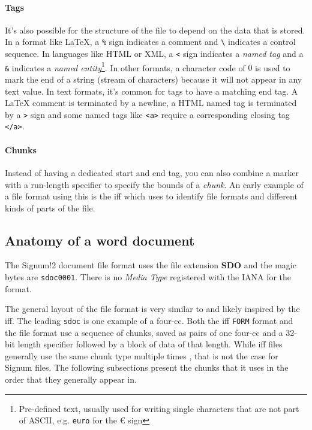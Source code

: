 \paragraph{Tags}
It's also possible for the structure of the file to depend on the data that is stored. In a format like \LaTeX, a \texttt{\%} sign indicates a comment and \texttt{\textbackslash} indicates a control sequence. In languages like HTML or XML, a \texttt{<} sign indicates a \textit{named tag} and a \texttt{\&} indicates a \textit{named entity}\footnote{Pre-defined text, usually used for writing single characters that are not part of ASCII, e.g. \texttt{euro} for the \euro{} sign}. In other formats, a character code of $0$ is used to mark the end of a string (stream of characters) because it will not appear in any text value. In text formats, it's common for tags to have a matching end tag. A \LaTeX{} comment is terminated by a newline, a HTML named tag is terminated by a \texttt{>} sign and some named tags like \texttt{<a>} require a corresponding closing tag \texttt{</a>}.

\paragraph{Chunks}
Instead of having a dedicated start and end tag, you can also combine a marker with a run-length specifier to specify the bounds of a \textit{chunk}. An early example of a file format using this is the  \acrfull{iff} which uses  to identify file formats and different kinds of parts of the file.

\subsection{Anatomy of a word document}

The Signum!2 document file format uses the file extension \textbf{SDO} and the magic \glspl{byte} are \texttt{sdoc0001}. There is no \textit{Media Type} registered with the IANA for the format.

The general layout of the file format is very similar to and likely inspired by the \acrshort{iff}. The leading \texttt{sdoc} is one example of a \acrshort{four-cc}. Both the \acrshort{iff} \texttt{FORM} format and the \Signum{} file format use a sequence of chunks, saved as pairs of one \acrshort{four-cc} and a 32-bit length specifier followed by a block of data of that length. While \acrshort{iff} files generally use the same chunk type multiple times \cite{amigaos:wordiff}, that is not the case for Signum files. The following subsections present the chunks that it uses in the order that they generally appear in.

